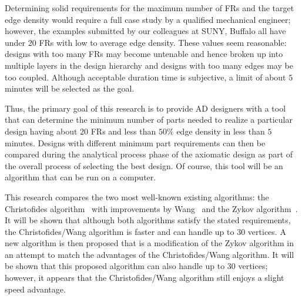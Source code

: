 Determining solid requirements for the maximum number of FRs and the target edge density would require a full case
study by a qualified mechanical engineer; however, the examples submitted by our colleagues at SUNY, Buffalo all
have under \(20\) FRs with low to average edge density.  These values seem reasonable: designs with too many FRs
may become untenable and hence broken up into multiple layers in the design hierarchy and designs with too many
edges may be too coupled.  Although acceptable duration time is subjective, a limit of about \(5\) minutes will be
selected as the goal.

Thus, the primary goal of this research is to provide AD designers with a tool that can determine the minimum
number of parts needed to realize a particular design having about \(20\) FRs and less than \(50\%\) edge density
in less than \(5\) minutes.  Designs with different minimum part requirements can then be compared during the
analytical process phase of the axiomatic design as part of the overall process of selecting the best design.  Of
course, this tool will be an algorithm that can be run on a computer.

This research compares the two most well-known existing algorithms: the Christofides algorithm~\cite{christofides}
with improvements by Wang~\cite{wang} and the Zykov algorithm~\cite{corneil}.  It will be shown that although both
algorithms satisfy the stated requirements, the Christofides/Wang algorithm is faster and can handle up to \(30\)
vertices.  A new algorithm is then proposed that is a modification of the Zykov algorithm in an attempt to match
the advantages of the Christofides/Wang algorithm.  It will be shown that this proposed algorithm can also handle
up to \(30\) vertices; however, it appears that the Christofides/Wang algorithm still enjoys a slight speed
advantage.
